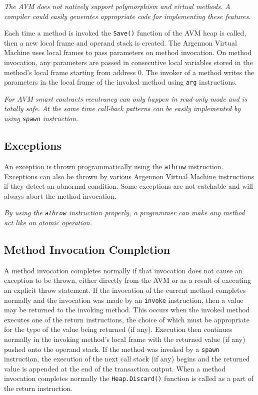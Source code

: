 \documentclass[11pt, a4paper]{report}
\newcommand{\note}[1] {
    \begin{tcolorbox}[colframe=white,colback=white]
        \emph{#1}
    \end{tcolorbox}
}
\begin{document}
    \note{The AVM does not natively support polymorphism and virtual methods. A compiler could easily
    generates appropriate code for implementing these features.}

    Each time a method is invoked the \texttt{Save()} function of the AVM heap is called, then a new local frame
    and operand stack is created. The Argennon Virtual Machine uses local frames to pass parameters on
    method invocation. On method invocation, any parameters are passed in consecutive local variables stored in the
    method's local frame starting from address 0. The invoker of a method writes the parameters in the local frame
    of the invoked method using \texttt{arg} instructions.

    \note{For AVM smart contracts \emph{reentrancy} can only happen in read-only mode and is totally safe.
    At the same time call-back patterns can be easily implemented by using \texttt{spawn} instruction.}

    \subsection{Exceptions}\label{subsec:exceptions}

    An exception is thrown programmatically using the \texttt{athrow} instruction. Exceptions can also be thrown by
    various Argennon Virtual Machine instructions if they detect an abnormal condition. Some exceptions are not
    catchable and will always abort the method invocation.

    \note{By using the \texttt{athrow} instruction properly, a programmer can make any method act like an atomic
    operation.}

    \subsection{Method Invocation Completion}\label{subsec:method-invocation-completion}

    A method invocation completes normally if that invocation does not cause an exception to be thrown, either
    directly from the AVM or as a result of executing an explicit throw statement. If the invocation of the current
    method completes normally and the invocation was made by an \texttt{invoke} instruction, then a value may be
    returned to the invoking method. This occurs when the invoked method executes one of the return instructions, the
    choice of which must be appropriate for the type of the value being returned (if any). Execution then continues
    normally in the invoking method's local frame with the returned
    value (if any) pushed onto the operand stack. If the method was invoked by a \texttt{spawn} instruction,
    the execution of the next call stack (if any) begins and the returned value
    is appended at the end of the transaction output. When a method invocation completes normally
    the \texttt{Heap.Discard()} function is called as a part of the return instruction.
\end{document}
